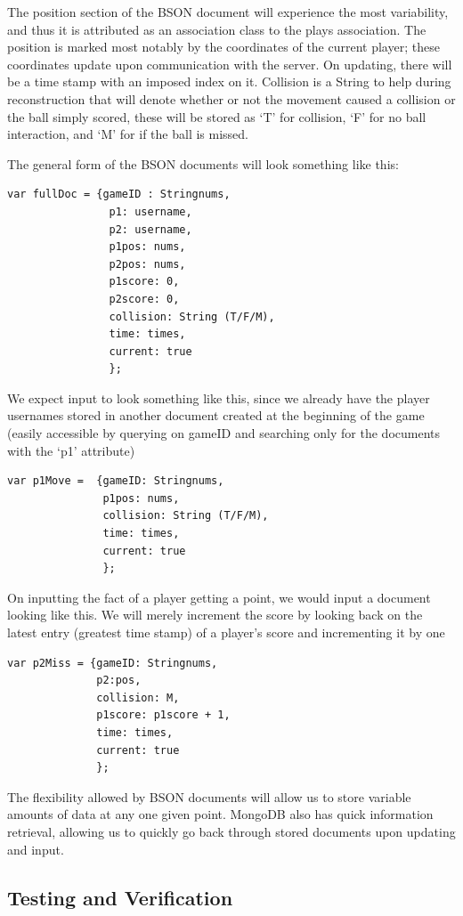 \documentclass[letterpaper,12pt]{article}
\begin{document}
The position section of the BSON document will experience the most variability, and thus it is attributed as an association class to the plays association. The position is marked most notably by the coordinates of the current player; these coordinates update upon communication with the server. On updating, there will be a time stamp with an imposed index on it. Collision is a String to help during reconstruction that will denote whether or not the movement caused a collision or the ball simply scored, these will be stored as ‘T’ for collision, ‘F’ for no ball interaction, and ‘M’ for if the ball is missed.

The general form of the BSON documents will look something like this:
\begin{verbatim}
var fullDoc = {gameID : Stringnums,
                p1: username, 
                p2: username, 
                p1pos: nums, 
                p2pos: nums, 
                p1score: 0, 
                p2score: 0, 
                collision: String (T/F/M), 
                time: times, 
                current: true
                };
\end{verbatim}
We expect input to look something like this, since we already have the player usernames stored in another document created at the beginning of the game (easily accessible by querying on gameID and searching only for the documents with the ‘p1’ attribute)
\begin{verbatim}
var p1Move =  {gameID: Stringnums,
               p1pos: nums,
               collision: String (T/F/M),
               time: times,
               current: true
               };
\end{verbatim}
On inputting the fact of a player getting a point, we would input a document looking like this. We will merely increment the score by looking back on the latest entry (greatest time stamp) of a player’s score and incrementing it by one
\begin{verbatim}
var p2Miss = {gameID: Stringnums,
              p2:pos,
              collision: M,
              p1score: p1score + 1,
              time: times,
              current: true
              };
\end{verbatim}
The flexibility allowed by BSON documents will allow us to store variable amounts of data at any one given point. MongoDB also has quick information retrieval, allowing us to quickly go back through stored documents upon updating and input.
\subsection{Testing and Verification}
\end{document}
